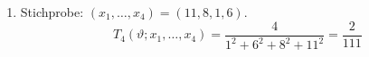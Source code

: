 \documentclass[a4paper]{scrartcl}
\newcommand{\dif}{\ \mathrm{d}}
\def \blattnr {7}
\begin{document}
\begin{enumerate}[label=\bfseries \blattnr.\arabic*]
\begin{enumerate}
\begin{proof}
\begin{equation*}
                    \vartheta_0 = \frac{n}{\sum_{i=1}^n x_i^2} 
                \end{equation*}
                Als Bestätigung, dass es sich bei dem Extrema um ein Maximum
                handelt, betrachten wir die 2. Ableitung.
                \begin{equation*}
                        \frac{\dif^2}{\dif\vartheta^2} \log \left( L(\vartheta;x_1,\dotsc,x_n) \right)
                        = -\frac{n}{\vartheta^2}
                        < 0 \text{ für } \vartheta_0 = \frac{n}{\sum_{i=1}^n x_i^2} > 0
                \end{equation*}
            \end{proof}

        \item 
            Stichprobe: $(x_1, \dotsc, x_4) = (11,8,1,6)$.
            \begin{equation*}
                T_4(\vartheta; x_1, \dotsc, x_4)
                = \frac{4}{1^2 + 6^2 + 8^2 + 11^2}
                = \frac{2}{111} 
            \end{equation*}

    \end{enumerate}


\end{enumerate}
\end{document}
